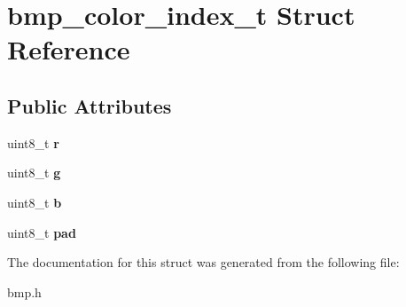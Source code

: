 \hypertarget{structbmp__color__index__t}{}\section{bmp\+\_\+color\+\_\+index\+\_\+t Struct Reference}
\label{structbmp__color__index__t}
\subsection*{Public Attributes}
\begin{DoxyCompactItemize}
\item 
\hypertarget{structbmp__color__index__t_af5e82c99ecf9e47cee9e242d1a7eeaee}{}\label{structbmp__color__index__t_af5e82c99ecf9e47cee9e242d1a7eeaee} 
uint8\+\_\+t {\bfseries r}
\item 
\hypertarget{structbmp__color__index__t_a6e16a3b6c387893a05bfbe664a913fea}{}\label{structbmp__color__index__t_a6e16a3b6c387893a05bfbe664a913fea} 
uint8\+\_\+t {\bfseries g}
\item 
\hypertarget{structbmp__color__index__t_a10e61e7e31ff435b130d0ec8e837c405}{}\label{structbmp__color__index__t_a10e61e7e31ff435b130d0ec8e837c405} 
uint8\+\_\+t {\bfseries b}
\item 
\hypertarget{structbmp__color__index__t_a9d5e31e981082828d6dd0736650d5c67}{}\label{structbmp__color__index__t_a9d5e31e981082828d6dd0736650d5c67} 
uint8\+\_\+t {\bfseries pad}
\end{DoxyCompactItemize}


The documentation for this struct was generated from the following file\+:\begin{DoxyCompactItemize}
\item 
bmp.\+h\end{DoxyCompactItemize}
